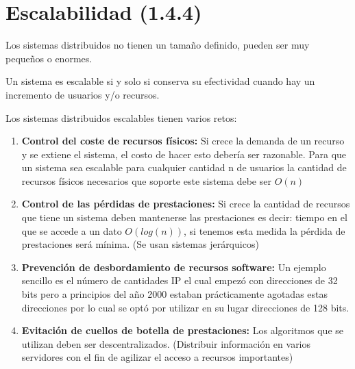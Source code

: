 \chapter{Escalabilidad (1.4.4)}
Los sistemas distribuidos no tienen un tamaño definido, pueden ser muy pequeños o enormes.

Un sistema es escalable si y solo si conserva su efectividad cuando hay un incremento de usuarios y/o recursos.

Los sistemas distribuidos escalables tienen varios retos:

\begin{enumerate}
    \item { \textbf{Control del coste de recursos físicos: } Si crece la demanda de un recurso y se extiene el sistema, el costo de hacer esto debería ser razonable. Para que un sistema sea escalable para cualquier cantidad n de usuarios la cantidad de recursos físicos necesarios que soporte este sistema debe ser $O(n)$}
    \item { \textbf{Control de las pérdidas de prestaciones: } Si crece la cantidad de recursos que tiene un sistema deben mantenerse las prestaciones es decir: tiempo en el que se accede a un dato $O(log(n))$, si tenemos esta medida la pérdida de prestaciones será mínima. (Se usan sistemas jerárquicos)} 
    \item { \textbf{Prevención de desbordamiento de recursos software: } Un ejemplo sencillo es el número de cantidades IP el cual empezó con direcciones de 32 bits pero a principios del año 2000 estaban prácticamente agotadas estas direcciones por lo cual se optó por utilizar en su lugar direcciones de 128 bits. }
    \item { \textbf{Evitación de cuellos de botella de prestaciones: } Los algoritmos que se utilizan deben ser descentralizados. (Distribuir información en varios servidores con el fin de agilizar el acceso a recursos importantes)}
\end{enumerate}

